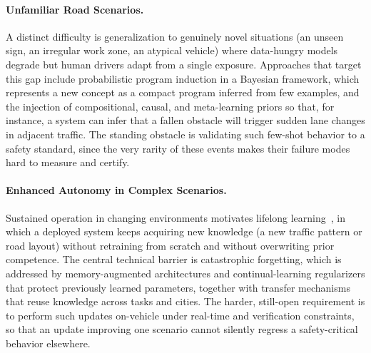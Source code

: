 \paragraph{Unfamiliar Road Scenarios.}
A distinct difficulty is generalization to genuinely novel situations (an unseen sign, an irregular work zone, an atypical vehicle) where data-hungry models degrade but human drivers adapt from a single exposure.
Approaches that target this gap include probabilistic program induction in a Bayesian framework, which represents a new concept as a compact program inferred from few examples, and the injection of compositional, causal, and meta-learning priors so that, for instance, a system can infer that a fallen obstacle will trigger sudden lane changes in adjacent traffic.
The standing obstacle is validating such few-shot behavior to a safety standard, since the very rarity of these events makes their failure modes hard to measure and certify.

\paragraph{Enhanced Autonomy in Complex Scenarios.}
Sustained operation in changing environments motivates lifelong learning~\cite{ZhuBZZW24}, in which a deployed system keeps acquiring new knowledge (a new traffic pattern or road layout) without retraining from scratch and without overwriting prior competence.
The central technical barrier is catastrophic forgetting, which is addressed by memory-augmented architectures and continual-learning regularizers that protect previously learned parameters, together with transfer mechanisms that reuse knowledge across tasks and cities.
The harder, still-open requirement is to perform such updates on-vehicle under real-time and verification constraints, so that an update improving one scenario cannot silently regress a safety-critical behavior elsewhere.
